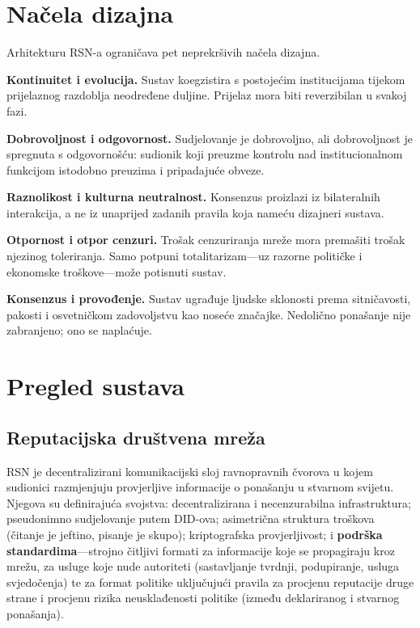 \documentclass[11pt,a4paper,twocolumn]{article}
\begin{document}
\section{Načela dizajna}

Arhitekturu RSN-a ograničava pet neprekršivih načela dizajna.

\textbf{Kontinuitet i evolucija.} Sustav koegzistira s postojećim institucijama tijekom prijelaznog razdoblja neodređene duljine. Prijelaz mora biti reverzibilan u svakoj fazi.

\textbf{Dobrovoljnost i odgovornost.} Sudjelovanje je dobrovoljno, ali dobrovoljnost je spregnuta s odgovornošću: sudionik koji preuzme kontrolu nad institucionalnom funkcijom istodobno preuzima i pripadajuće obveze.

\textbf{Raznolikost i kulturna neutralnost.} Konsenzus proizlazi iz bilateralnih interakcija, a ne iz unaprijed zadanih pravila koja nameću dizajneri sustava.

\textbf{Otpornost i otpor cenzuri.} Trošak cenzuriranja mreže mora premašiti trošak njezinog toleriranja. Samo potpuni totalitarizam---uz razorne političke i ekonomske troškove---može potisnuti sustav.

\textbf{Konsenzus i provođenje.} Sustav ugrađuje ljudske sklonosti prema sitničavosti, pakosti i osvetničkom zadovoljstvu kao noseće značajke. Nedolično ponašanje nije zabranjeno; ono se naplaćuje.

\section{Pregled sustava}

\subsection{Reputacijska društvena mreža}

RSN je decentralizirani komunikacijski sloj ravnopravnih čvorova u kojem sudionici razmjenjuju provjerljive informacije o ponašanju u stvarnom svijetu. Njegova su definirajuća svojstva: decentralizirana i necenzurabilna infrastruktura; pseudonimno sudjelovanje putem DID-ova; asimetrična struktura troškova (čitanje je jeftino, pisanje je skupo); kriptografska provjerljivost; i \textbf{podrška standardima}---strojno čitljivi formati za informacije koje se propagiraju kroz mrežu, za usluge koje nude autoriteti (sastavljanje tvrdnji, podupiranje, usluga svjedočenja) te za format politike uključujući pravila za procjenu reputacije druge strane i procjenu rizika neusklađenosti politike (između deklariranog i stvarnog ponašanja).
\end{document}
